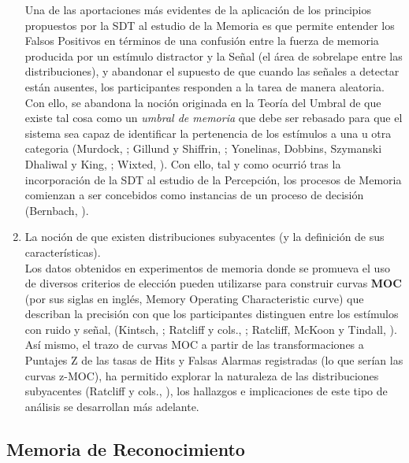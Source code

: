 \begin{enumerate}
Una de las aportaciones más evidentes de la aplicación de los principios propuestos por la SDT al estudio de la Memoria es que permite entender los Falsos Positivos en términos de una confusión entre la fuerza de memoria producida por un estímulo distractor y la Señal (el área de sobrelape entre las distribuciones), y abandonar el supuesto de que cuando las señales a detectar están ausentes, los participantes responden a la tarea de manera aleatoria. Con ello, se abandona la noción originada en la Teoría del Umbral de que existe tal cosa como un \textit{umbral de memoria} que debe ser rebasado para que el sistema sea capaz de identificar la pertenencia de los estímulos a una u otra categoria (Murdock, \citeyear{Murdock1982}; Gillund y Shiffrin, \citeyear{Gillund1984}; Yonelinas, Dobbins, Szymanski Dhaliwal y King, \citeyear{Yonelinas1996}; Wixted, \citeyear{Wixted2007}). Con ello, tal y como ocurrió tras la incorporación de la SDT al estudio de la Percepción, los procesos de Memoria comienzan a ser concebidos como instancias de un proceso de decisión (Bernbach, \citeyear{Bernbach1967}).\\
 
\item La noción de que existen distribuciones subyacentes (y la definición de sus características).\\

Los datos obtenidos en experimentos de memoria donde se promueva el uso de diversos criterios de elección pueden utilizarse para construir curvas \textbf{MOC} (por sus siglas en inglés, Memory Operating Characteristic curve) que describan la precisión con que los participantes distinguen entre los estímulos con ruido y señal, (Kintsch, \citeyear{Kintsch1967}; Ratcliff y cols., \citeyear{Ratcliff1992}; Ratcliff, McKoon y Tindall, \citeyear{Ratcliff1994}). Así mismo, el trazo de curvas MOC a partir de las transformaciones a Puntajes Z de las tasas de Hits y Falsas Alarmas registradas (lo que serían las curvas z-MOC), ha permitido explorar la naturaleza de las distribuciones subyacentes (Ratcliff y cols., \citeyear{Ratcliff1992}), los hallazgos e implicaciones de este tipo de análisis se desarrollan más adelante.\\
\end{enumerate} 

\subsection{Memoria de Reconocimiento}

